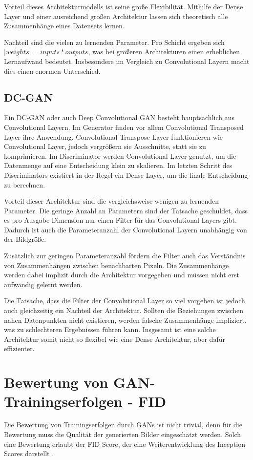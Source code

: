 Vorteil dieses Architekturmodells ist seine große Flexibilität.
Mithilfe der Dense Layer und einer ausreichend großen Architektur lassen sich theoretisch alle Zusammenhänge eines Datensets lernen.
\newline

Nachteil sind die vielen zu lernenden Parameter.
Pro Schicht ergeben sich $|weights| = inputs * outputs$, was bei größeren Architekturen einen erheblichen Lernaufwand bedeutet.
Insbesondere im Vergleich zu Convolutional Layern macht dies einen enormen Unterschied.

\subsection{DC-GAN}
Ein DC-GAN oder auch Deep Convolutional GAN besteht hauptsächlich aus Convolutional Layern.
Im Generator finden vor allem Convolutional Transposed Layer ihre Anwendung.
Convolutional Transpose Layer funktionieren wie Convolutional Layer, jedoch vergrößern sie Ausschnitte, statt sie zu komprimieren.
Im Discriminator werden Convolutional Layer genutzt, um die Datenmenge auf eine Entscheidung klein zu skalieren.
Im letzten Schritt des Discriminators existiert in der Regel ein Dense Layer, um die finale Entscheidung zu berechnen.
\newline

Vorteil dieser Architektur sind die vergleichsweise wenigen zu lernenden Parameter.
Die geringe Anzahl an Parametern sind der Tatsache geschuldet, dass es pro Ausgabe-Dimension nur einen Filter für das Convolutional Layers gibt.
Dadurch ist auch die Parameteranzahl der Convolutional Layern unabhängig von der Bildgröße.

Zusätzlich zur geringen Parameteranzahl fördern die Filter auch das Verständnis von Zusammenhängen zwischen benachbarten Pixeln.
Die Zusammenhänge werden dabei implizit durch die Architektur vorgegeben und müssen nicht erst aufwändig gelernt werden.
\newline

Die Tatsache, dass die Filter der Convolutional Layer so viel vorgeben ist jedoch auch gleichzeitig ein Nachteil der Architektur.
Sollten die Beziehungen zwischen nahen Datenpunkten nicht existieren, werden falsche Zusammenhänge impliziert, was zu schlechteren Ergebnissen führen kann.
Insgesamt ist eine solche Architektur somit nicht so flexibel wie eine Dense Architektur, aber dafür effizienter.

\section{Bewertung von GAN-Trainingserfolgen - FID}
Die Bewertung von Trainingserfolgen durch GANs ist nicht trivial, denn für die Bewertung muss die Qualität der generierten Bilder eingeschätzt werden.
Solch eine Bewertung erlaubt der \acrfull{FID} Score, der eine Weiterentwicklung des Inception Scores darstellt \cite{are-gans-created-equally}.
\newline

